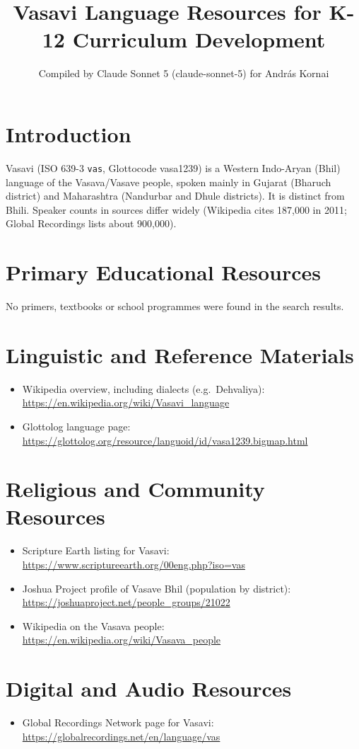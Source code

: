 \documentclass[12pt]{article}
\title{Vasavi Language Resources for K-12 Curriculum Development}
\author{Compiled by Claude Sonnet 5 (claude-sonnet-5) for Andr\'as Kornai}
\date{}
\begin{document}
\maketitle

\section{Introduction}
Vasavi (ISO 639-3 \texttt{vas}, Glottocode vasa1239) is a Western Indo-Aryan (Bhil) language of the Vasava/Vasave people, spoken mainly in Gujarat (Bharuch district) and Maharashtra (Nandurbar and Dhule districts). It is distinct from Bhili. Speaker counts in sources differ widely (Wikipedia cites 187,000 in 2011; Global Recordings lists about 900,000).

\section{Primary Educational Resources}
No primers, textbooks or school programmes were found in the search results.

\section{Linguistic and Reference Materials}
\begin{itemize}
\item Wikipedia overview, including dialects (e.g.\ Dehvaliya): \url{https://en.wikipedia.org/wiki/Vasavi_language}
\item Glottolog language page: \url{https://glottolog.org/resource/languoid/id/vasa1239.bigmap.html}
\end{itemize}

\section{Religious and Community Resources}
\begin{itemize}
\item Scripture Earth listing for Vasavi: \url{https://www.scriptureearth.org/00eng.php?iso=vas}
\item Joshua Project profile of Vasave Bhil (population by district): \url{https://joshuaproject.net/people_groups/21022}
\item Wikipedia on the Vasava people: \url{https://en.wikipedia.org/wiki/Vasava_people}
\end{itemize}

\section{Digital and Audio Resources}
\begin{itemize}
\item Global Recordings Network page for Vasavi: \url{https://globalrecordings.net/en/language/vas}
\end{itemize}
\end{document}

